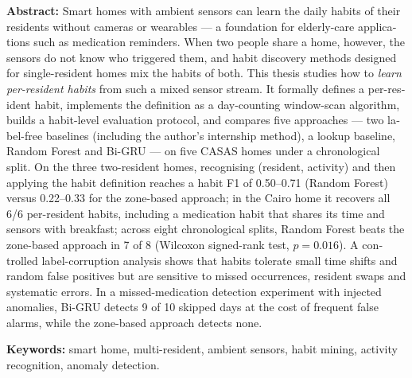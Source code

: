 \vspace{1cm}
\begin{otherlanguage}{english}
\noindent\textbf{Abstract:} Smart homes with ambient sensors can learn the daily habits of their
residents without cameras or wearables --- a foundation for elderly-care applications such as medication
reminders. When two people share a home, however, the sensors do not know who triggered them, and habit
discovery methods designed for single-resident homes mix the habits of both. This thesis studies how to
\emph{learn per-resident habits} from such a mixed sensor stream. It formally defines a per-resident habit,
implements the definition as a day-counting window-scan algorithm, builds a habit-level evaluation
protocol, and compares five approaches --- two label-free baselines (including the author's internship
method), a lookup baseline, Random Forest and Bi-GRU --- on five CASAS homes under a chronological split.
On the three two-resident homes, recognising (resident, activity) and then applying the habit definition
reaches a habit F1 of 0.50--0.71 (Random Forest) versus 0.22--0.33 for the zone-based approach; in the
Cairo home it recovers all 6/6 per-resident habits, including a medication habit that shares its time and
sensors with breakfast; across eight chronological splits, Random Forest beats the zone-based approach in 7 of 8
(Wilcoxon signed-rank test, $p = 0.016$). A controlled label-corruption analysis shows that habits tolerate small time
shifts and random false positives but are sensitive to missed occurrences, resident swaps and systematic
errors. In a missed-medication detection experiment with injected anomalies, Bi-GRU detects 9 of 10
skipped days at the cost of frequent false alarms, while the zone-based approach detects none.

\noindent\textbf{Keywords:} smart home, multi-resident, ambient sensors, habit mining, activity
recognition, anomaly detection.
\end{otherlanguage}
